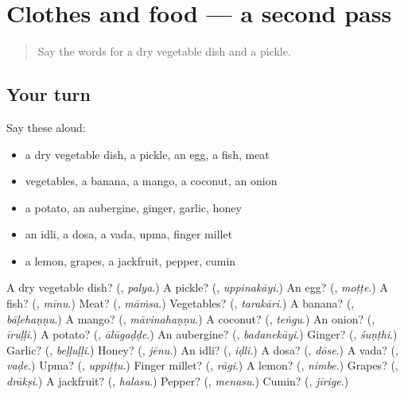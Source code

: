 \section[(dialogue)]{Clothes and food — a second pass}

\label{lesson:KA-R126-second-pass-clothes-and-food}



\begin{quote}
Say the words for a dry vegetable dish and a pickle.
\end{quote}

\subsection*{Your turn}
Say these aloud:

\begin{itemize}
\raggedright
  \item a dry vegetable dish, a pickle, an egg, a fish, meat
  \item vegetables, a banana, a mango, a coconut, an onion
  \item a potato, an aubergine, ginger, garlic, honey
  \item an idli, a dosa, a vada, upma, finger millet
  \item a lemon, grapes, a jackfruit, pepper, cumin
\end{itemize}

\begin{tcolorbox}[breakable,colback=teal!4,colframe=teal!35!black,title={Before you move on}]
A dry vegetable dish? (\textbf{}, \emph{palya}.) A pickle? (\textbf{}, \emph{uppinakāyi}.) An egg? (\textbf{}, \emph{moṭṭe}.) A fish? (\textbf{}, \emph{mīnu}.) Meat? (\textbf{}, \emph{māṁsa}.) Vegetables? (\textbf{}, \emph{tarakāri}.) A banana? (\textbf{}, \emph{bāḷehaṇṇu}.) A mango? (\textbf{}, \emph{māvinahaṇṇu}.) A coconut? (\textbf{}, \emph{teṅgu}.) An onion? (\textbf{}, \emph{īruḷḷi}.) A potato? (\textbf{}, \emph{ālūgaḍḍe}.) An aubergine? (\textbf{}, \emph{badanekāyi}.) Ginger? (\textbf{}, \emph{śuṇṭhi}.) Garlic? (\textbf{}, \emph{beḷḷuḷḷi}.) Honey? (\textbf{}, \emph{jēnu}.) An idli? (\textbf{}, \emph{iḍli}.) A dosa? (\textbf{}, \emph{dōse}.) A vada? (\textbf{}, \emph{vaḍe}.) Upma? (\textbf{}, \emph{uppiṭṭu}.) Finger millet? (\textbf{}, \emph{rāgi}.) A lemon? (\textbf{}, \emph{nimbe}.) Grapes? (\textbf{}, \emph{drākṣi}.) A jackfruit? (\textbf{}, \emph{halasu}.) Pepper? (\textbf{}, \emph{menasu}.) Cumin? (\textbf{}, \emph{jīrige}.)
\end{tcolorbox}
